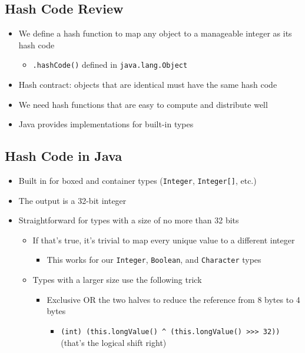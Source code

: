 \documentclass[10pt]{article}
\begin{document}
\subsection*{Hash Code Review}
\begin{itemize}
    \item We define a hash function to map any object to a manageable integer as its hash code
    \begin{itemize}
        \item \texttt{.hashCode()} defined in \texttt{java.lang.Object}
    \end{itemize}
    \item Hash contract: objects that are identical must have the same hash code
    \item We need hash functions that are easy to compute and distribute well
    \item Java provides implementations for built-in types
\end{itemize}


\subsection*{Hash Code in Java}
\begin{itemize}
    \item Built in for boxed and container types (\texttt{Integer}, \texttt{Integer[]}, etc.)
    \item The output is a 32-bit integer
    \item Straightforward for types with a size of no more than 32 bits
    \begin{itemize}
        \item If that's true, it's trivial to map every unique value to a different integer
        \begin{itemize}
            \item This works for our \texttt{Integer}, \texttt{Boolean}, and \texttt{Character} types
        \end{itemize}
        \item Types with a larger size use the following trick
        \begin{itemize}
            \item Exclusive OR the two halves to reduce the reference from 8 bytes to 4 bytes
            \begin{itemize}
                \item \texttt{(int) (this.longValue() ^ (this.longValue() >>> 32))} (that's the logical shift right)
            \end{itemize}
        \end{itemize}
    \end{itemize}
\end{itemize}
\end{document}

